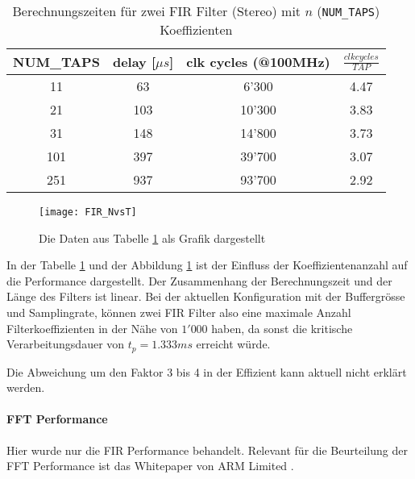 \begin{table}[H]
	\centering
	\begin{tabular}{|c|c|c|c|}
		\hline
		\textbf{NUM\_TAPS} & \textbf{delay {[}$\mu s${]}} & \textbf{clk cycles (@100MHz)} & \textbf{$\frac{\si{clk cycles}}{\si{TAP}}$} \\ \hline
		11                 & 63                      & 6'300                          & 4.47                       \\ \hline
		21                 & 103                     & 10'300                         & 3.83                       \\ \hline
		31                 & 148                     & 14'800                         & 3.73                       \\ \hline
		101                & 397                     & 39'700                         & 3.07                       \\ \hline
		251                & 937                     & 93'700                         & 2.92                       \\ \hline
	\end{tabular}
	\caption{Berechnungszeiten für zwei FIR Filter (Stereo) mit $n$ (\texttt{NUM\_TAPS}) Koeffizienten}
	\label{tab:FIR_performance}
\end{table}


\begin{figure}[H]
	\centering
	\texttt{[image: FIR\_NvsT]}
	\caption{Die Daten aus Tabelle \ref{tab:FIR_performance} als Grafik dargestellt}
	\label{pic:FIR_NvsT}
\end{figure}


In der Tabelle \ref{tab:FIR_performance} und der Abbildung \ref{pic:FIR_NvsT} ist der Einfluss der Koeffizientenanzahl auf die Performance dargestellt.
Der Zusammenhang der Berechnungszeit und der Länge des Filters ist linear.
Bei der aktuellen Konfiguration mit der Buffergrösse und Samplingrate, können zwei FIR Filter also eine maximale Anzahl Filterkoeffizienten in der Nähe von $1'000$ haben, da sonst die kritische Verarbeitungsdauer von $t_{p}=1.333\si{ms}$ erreicht würde.

Die Abweichung um den Faktor 3 bis 4 in der Effizient kann aktuell nicht erklärt werden.

\paragraph{FFT Performance}

Hier wurde nur die FIR Performance behandelt. Relevant für die Beurteilung der FFT Performance ist das Whitepaper von ARM Limited \cite{ARM-Performance-Whitepaper}.

